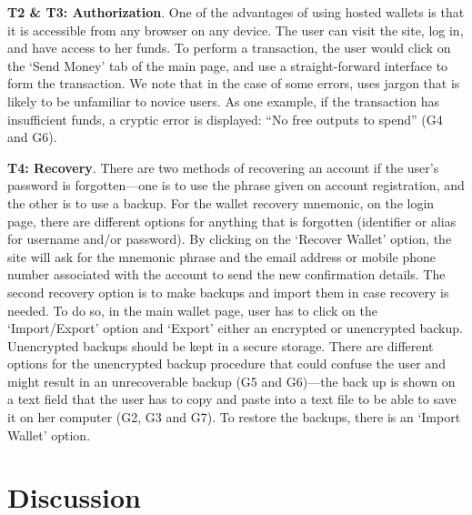 \textbf{T2 \& T3: Authorization}.
\label{hosted transaction}
One of the advantages of using hosted wallets is that it is accessible from any browser on any device. The user can visit the site, log in, and have access to her funds. To perform a transaction, the user would click on the `Send Money' tab of the main page, and use a straight-forward interface to form the transaction. We note that in the case of some errors, \block uses jargon that is likely to be unfamiliar to novice users. As one example, if the transaction has insufficient funds, a cryptic error is displayed: ``No free outputs to spend'' (G4 and G6).

\textbf{T4: Recovery}.
There are two methods of recovering an account if the user's password is forgotten---one is to use the phrase given on account registration, and the other is to use a backup. For the wallet recovery mnemonic, on the login page, there are different options for anything that is forgotten (identifier or alias for username and/or password). By clicking on the `Recover Wallet' option, the site will ask for the mnemonic phrase and the email address or mobile phone number associated with the account to send the new confirmation details. The second recovery option is to make backups and import them in case recovery is needed. To do so, in the main wallet page, user has to click on the `Import/Export' option and `Export' either an encrypted or unencrypted backup. Unencrypted backups should be kept in a secure storage. There are different options for the unencrypted backup procedure that could confuse the user and might result in an unrecoverable backup (G5 and G6)---the back up is shown on a text field that the user has to copy and paste into a text file to be able to save it on her computer (G2, G3 and G7). To restore the backups, there is an `Import Wallet' option.



\section{Discussion}



